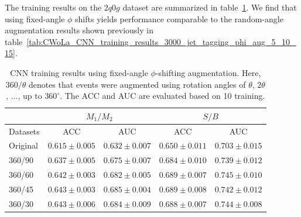 \documentclass[12pt]{article}
\begin{document}
    The training results on the $2q0g$ dataset are summarized in table~\ref{tab:CWoLa_CNN_training_results_3000_jet_tagging_phi_aug_fix_30_45_60_90}. We find that using fixed-angle $\phi$ shifts yields performance comparable to the random-angle augmentation results shown previously in table~\ref{tab:CWoLa_CNN_training_results_3000_jet_tagging_phi_aug_5_10_15}.
    \begin{table}[htpb]
        \centering
        \caption{CNN training results using fixed-angle $\phi$-shifting augmentation. Here, $360/\theta$ denotes that events were augmented using rotation angles of $\theta$, $2\theta$, ..., up to $360^\circ$. The ACC and AUC are evaluated based on 10 training.}
        \label{tab:CWoLa_CNN_training_results_3000_jet_tagging_phi_aug_fix_30_45_60_90}
        \begin{tabular}{l|cc|cc}
                     & \multicolumn{2}{c|}{$M_1 / M_2$}      & \multicolumn{2}{c}{$S / B$}           \\ \hline
            Datasets & ACC               & AUC               & ACC               & AUC               \\ \hline
            Original & $0.615 \pm 0.005$ & $0.632 \pm 0.007$ & $0.650 \pm 0.011$ & $0.703 \pm 0.015$ \\
            360/90   & $0.637 \pm 0.005$ & $0.675 \pm 0.007$ & $0.684 \pm 0.010$ & $0.739 \pm 0.012$ \\
            360/60   & $0.642 \pm 0.003$ & $0.682 \pm 0.005$ & $0.689 \pm 0.007$ & $0.745 \pm 0.010$ \\
            360/45   & $0.643 \pm 0.003$ & $0.685 \pm 0.004$ & $0.689 \pm 0.008$ & $0.742 \pm 0.012$ \\
            360/30   & $0.643 \pm 0.006$ & $0.684 \pm 0.009$ & $0.688 \pm 0.007$ & $0.744 \pm 0.008$
        \end{tabular}
    \end{table}




\end{document}
